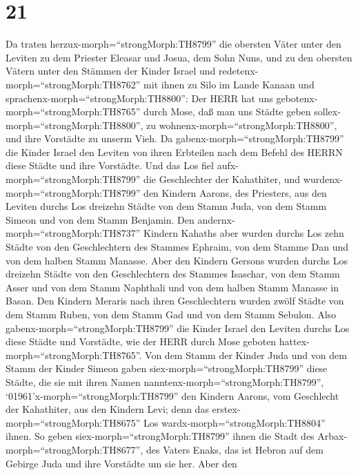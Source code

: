 \hypertarget{section-20}{%
\section{21}\label{section-20}}

 Da traten herzux-morph=``strongMorph:TH8799'' die obersten
Väter unter den Leviten zu dem Priester Eleasar und Josua, dem Sohn
Nuns, und zu den obersten Vätern unter den Stämmen der Kinder Israel
 und redetenx-morph=``strongMorph:TH8762'' mit ihnen zu Silo
im Lande Kanaan und sprachenx-morph=``strongMorph:TH8800'': Der HERR hat
uns gebotenx-morph=``strongMorph:TH8765'' durch Mose, daß man uns Städte
geben sollex-morph=``strongMorph:TH8800'', zu
wohnenx-morph=``strongMorph:TH8800'', und ihre Vorstädte zu unserm Vieh.
 Da gabenx-morph=``strongMorph:TH8799'' die Kinder Israel
den Leviten von ihren Erbteilen nach dem Befehl des HERRN diese Städte
und ihre Vorstädte.  Und das Los fiel
aufx-morph=``strongMorph:TH8799'' die Geschlechter der Kahathiter, und
wurdenx-morph=``strongMorph:TH8799'' den Kindern Aarons, des Priesters,
aus den Leviten durchs Los dreizehn Städte von dem Stamm Juda, von dem
Stamm Simeon und von dem Stamm Benjamin.  Den
andernx-morph=``strongMorph:TH8737'' Kindern Kahaths aber wurden durchs
Los zehn Städte von den Geschlechtern des Stammes Ephraim, von dem
Stamme Dan und von dem halben Stamm Manasse.  Aber den
Kindern Gersons wurden durchs Los dreizehn Städte von den Geschlechtern
des Stammes Isaschar, von dem Stamm Asser und von dem Stamm Naphthali
und von dem halben Stamm Manasse in Basan.  Den Kindern
Meraris nach ihren Geschlechtern wurden zwölf Städte von dem Stamm
Ruben, von dem Stamm Gad und von dem Stamm Sebulon.  Also
gabenx-morph=``strongMorph:TH8799'' die Kinder Israel den Leviten durchs
Los diese Städte und Vorstädte, wie der HERR durch Mose geboten
hattex-morph=``strongMorph:TH8765''.  Von dem Stamm der
Kinder Juda und von dem Stamm der Kinder Simeon gaben
siex-morph=``strongMorph:TH8799'' diese Städte, die sie mit ihren Namen
nanntenx-morph=``strongMorph:TH8799'', 
`01961'\textbar x-morph=``strongMorph:TH8799'' den Kindern Aarons, vom
Geschlecht der Kahathiter, aus den Kindern Levi; denn das
erstex-morph=``strongMorph:TH8675'' Los
wardx-morph=``strongMorph:TH8804'' ihnen.  So geben
siex-morph=``strongMorph:TH8799'' ihnen die Stadt des
Arbax-morph=``strongMorph:TH8677'', des Vaters Enaks, das ist Hebron auf
dem Gebirge Juda und ihre Vorstädte um sie her.  Aber den
